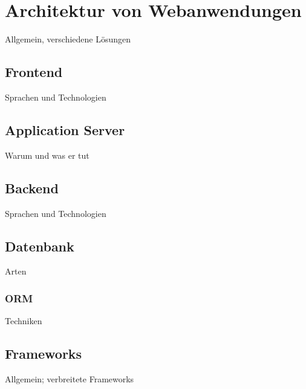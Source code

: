 \section{Architektur von Webanwendungen}
Allgemein, verschiedene Lösungen
\subsection{Frontend}
Sprachen und Technologien
\subsection{Application Server}
Warum und was er tut
\subsection{Backend}
Sprachen und Technologien
\subsection{Datenbank}
Arten
\subsubsection{ORM}
Techniken
\subsection{Frameworks}
Allgemein; verbreitete Frameworks